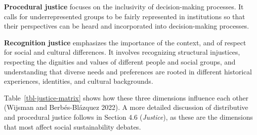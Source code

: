 \documentclass[
  a4paper,
  DIV=11,
  numbers=noendperiod,
  oneside,
  openany]{scrreprt}
\begin{document}
\textbf{Procedural justice} focuses on the inclusivity of
decision-making processes. It calls for underrepresented groups to be
fairly represented in institutions so that their perspectives can be
heard and incorporated into decision-making processes.

\textbf{Recognition justice} emphasizes the importance of the context,
and of respect for social and cultural differences. It involves
recognizing structural injustices, respecting the dignities and values
of different people and social groups, and understanding that diverse
needs and preferences are rooted in different historical experiences,
identities, and cultural backgrounds.

Table~\ref{tbl-justice-matrix} shows how these three dimensions
influence each other (Wijsman and Berbés-Blázquez 2022). A more detailed
discussion of distributive and procedural justice follows in Section 4.6
(\emph{Justice}), as these are the dimensions that most affect social
sustainability debates.

\begingroup\fontsize{8}{10}\selectfont
\end{document}
